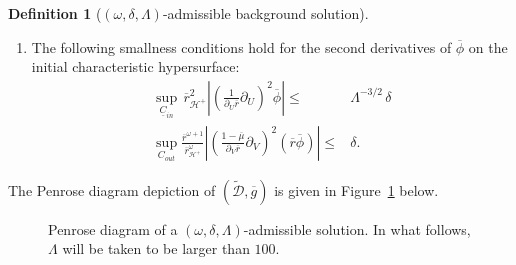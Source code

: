 \documentclass[10pt, reqno]{amsart}
\theoremstyle{definition}
\newtheorem{definition}[theorem]{Definition}
\theoremstyle{remark}
\theoremstyle{conjecture}
\numberwithin{equation}{section}
\newcommand{\rd}{\partial}
\newcommand{\0}{\emptyset}
\newcommand{\dlt}{\delta}
\newcommand{\Lmb}{\Lambda}
\newcommand{\omg}{\omega}
\newcommand{\calD}{\mathcal D}
\newcommand{\calH}{\mathcal H}
\newcommand{\uC}{\underline{C}}
\newcommand{\EH}{\calH^{+}}
\newcommand{\gbg}{\overline{g}}					%
\newcommand{\phibg}{\overline{\phi}}				%
\newcommand{\rbg}{\overline{r}}					%
\newcommand{\mubg}{\overline{\mu}}				%
\newcommand{\Abs}[1]{\left\vert #1 \right\vert}
\begin{document}
\begin{definition} [$(\omg, \dlt, \Lambda)$-admissible background solution]
\begin{enumerate}
\item The following smallness conditions hold for the second derivatives of $\phibg$ on the initial characteristic hypersurface:
\begin{align} 
	\sup_{\uC_{in}} \, \rbg_{\EH}^{2}\Abs{\left(\frac{1}{\rd_{U} \rbg} \rd_{U}\right)^{2} \phibg} \leq & \Lmb^{-3/2} \, \dlt \label{eq:dlt-adm-duduphi} \\
	\sup_{C_{out}} \frac{\rbg^{\omg+1}}{\rbg_{\EH}^{\omg}} \Abs{\left(\frac{1-\mubg}{\rd_{V} \rbg} \rd_{V}\right)^{2} (\rbg \phibg)} \leq &  \dlt. \label{eq:dlt-adm-dvdvrphi}
\end{align}
\end{enumerate}
\end{definition}

The Penrose diagram depiction of $(\widetilde{\calD}, \gbg)$ is given in Figure~\ref{fig:dlt-adm} below.
\begin{figure}[h]
\begin{center}
\def\svgwidth{250px}
 
\caption{Penrose diagram of a $(\omg, \dlt, \Lmb)$-admissible solution. In what follows, $\Lmb$ will be taken to be larger than $100$.} \label{fig:dlt-adm}
\end{center}
\end{figure}
\end{document}
